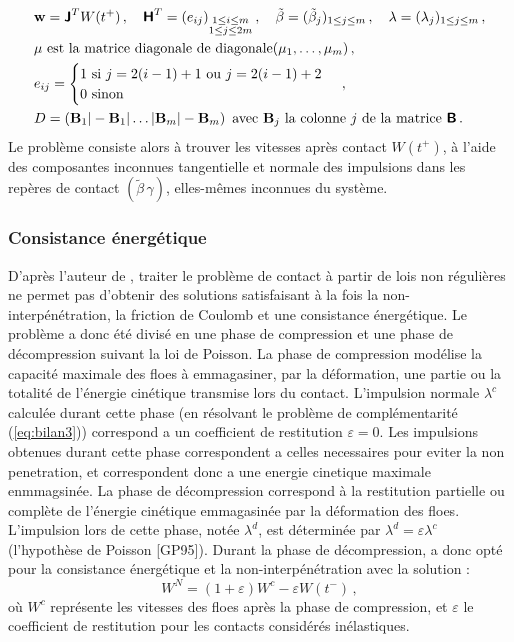 \begin{align*}
    &\bm{\mathrm{w}} = \bm{\mathsf{J}}^T W(t^+) \,, \quad
    \bm{\mathsf{H}}^T = (e_{ij})_{\substack{1 \leq i \leq m \\ 1 \leq j \leq 2m}} \,, \quad \tilde{\beta} = (\tilde{\beta}_j)_{1\leq j \leq m} \,, \quad \lambda = (\lambda_j)_{1 \leq j \leq m} \,, \\
    &\mu \text{ est la matrice diagonale de diagonale} (\mu_1,\dots, \mu_m) \,,\\
    &e_{ij} = \begin{cases}
        1 \text{   si } j = 2(i-1) + 1 \text{ ou } j=2(i-1) + 2 \\
        0 \text{   sinon} 
    \end{cases} \,,\\
    &D = (\bm{\mathrm{B}}_1 \vert - \bm{\mathrm{B}}_1 \vert \ldots \vert \bm{\mathrm{B}}_m \vert -\bm{\mathrm{B}}_m) \, \text{   avec } \bm{\mathrm{B}}_j \text{ la colonne } j \text{ de la matrice } \bm{\mathsf{B}} \,.
\end{align*}
Le problème consiste alors à trouver les vitesses après contact $W(t^{+})$, à l’aide des composantes inconnues tangentielle et normale des impulsions dans les repères de contact $(\tilde{\beta}\, \gamma)$, elles-mêmes inconnues du système.  


\subsubsection{Consistance énergétique}
D'après l'auteur de \parencite[p.42]{rabatel2015thesis}, traiter le problème de contact à partir de lois non régulières ne permet pas d’obtenir des solutions satisfaisant à la fois la non-interpénétration, la friction de Coulomb et une consistance énergétique. Le problème a donc été divisé en une phase de compression et une phase de décompression suivant la loi de Poisson. La phase de compression modélise la capacité maximale des
floes à emmagasiner, par la déformation, une partie ou la totalité de l’énergie cinétique transmise lors du contact. L'impulsion normale $\lambda^c$ calculée durant cette phase (en résolvant le problème de complémentarité (\cref{eq:bilan3})) correspond a un coefficient de restitution $\varepsilon = 0$. Les impulsions obtenues durant cette phase correspondent a celles necessaires pour eviter la non penetration, et correspondent donc a une energie cinetique maximale enmmagsinée. La phase de décompression correspond à la restitution partielle ou complète de l’énergie cinétique emmagasinée par la déformation des floes. L’impulsion lors de cette phase, notée $\lambda^d$, est déterminée par $\lambda^d = \varepsilon \lambda^c$ (l’hypothèse de Poisson [GP95]). Durant la phase de décompression, \citeauthor{rabatel2015thesis} a donc opté pour la consistance énergétique et la non-interpénétration avec la solution :
$$
W^N = (1 + \varepsilon)W^{c} - \varepsilon W(t^{-}) \,,
$$
où $W^c$ représente les vitesses des floes après la phase de compression, et $\varepsilon$ le coefficient de restitution pour les contacts considérés inélastiques.

